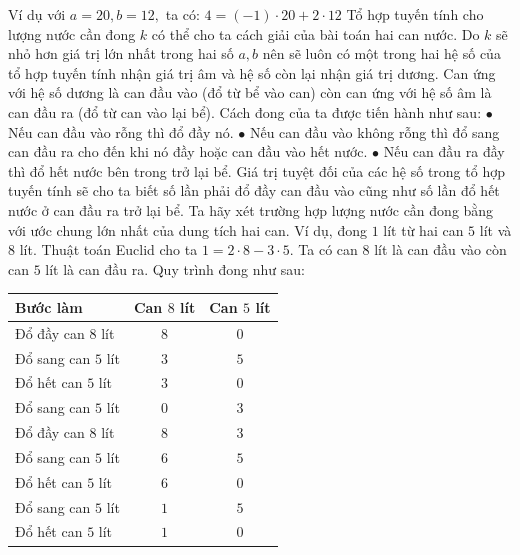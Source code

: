 \begin{multicols}{2}
	Ví dụ với $a=20,b=12,$ ta có: $4=(-1)\cdot 20+2\cdot 12$
	\vskip 0.1cm
	Tổ hợp tuyến tính cho lượng nước cần đong $k$ có thể cho ta cách giải của bài toán hai can nước. Do $k$ sẽ nhỏ hơn giá trị lớn nhất trong hai số $a,b$ nên sẽ luôn có một trong hai hệ số của tổ hợp tuyến tính nhận giá trị âm và hệ số còn lại nhận giá trị dương. Can ứng với hệ số dương là can đầu vào (đổ từ bể vào can) còn can ứng với hệ số âm là can đầu ra (đổ từ can vào lại bể).
	\vskip 0.1cm
	Cách đong của ta được tiến hành như sau:
	\vskip 0.05cm
	$\bullet$ Nếu can đầu vào rỗng thì đổ đầy nó.
	\vskip 0.05cm
	$\bullet$ Nếu can đầu vào không rỗng thì đổ sang can đầu ra cho đến khi nó đầy hoặc can đầu vào hết nước.
	\vskip 0.05cm
	$\bullet$ Nếu can đầu ra đầy thì đổ hết nước bên trong trở lại bể.
	\vskip 0.05cm
	Giá trị tuyệt đối của các hệ số trong tổ hợp tuyến tính sẽ cho ta biết số lần phải đổ đầy can đầu vào cũng như số lần đổ hết nước ở can đầu ra trở lại bể.
	\vskip 0.05cm
	Ta hãy xét trường hợp lượng nước cần đong bằng với ước chung lớn nhất của dung tích hai can. Ví dụ, đong $1$ lít từ hai can $5$ lít và $8$ lít. Thuật toán Euclid cho ta $1=2\cdot 8-3\cdot 5$. Ta có can $8$ lít là can đầu vào còn can $5$ lít là can đầu ra.
	\vskip 0.05cm
	Quy trình đong như sau:
	\begin{table}[H]
		\vspace*{-5pt}
		\centering
		\captionsetup{labelformat= empty, justification=centering}
		\setlength{\tabcolsep}{7pt}
		\renewcommand{\arraystretch}{1.1}
		\begin{tabular}{|l|c|c|}
			\hline
			Bước làm&	Can $8$ lít&	Can $5$ lít\\
			\hline
			Đổ đầy can $8$ lít&	$8$&	$0$\\
			\hline
			Đổ sang can $5$ lít&	$3$&	$5$\\
			\hline
			Đổ hết can $5$ lít&	$3$&	$0$\\
			\hline
			Đổ sang can $5$ lít&	$0$&	$3$\\
			\hline
			Đổ đầy can $8$ lít&	$8$&	$3$\\
			\hline
			Đổ sang can $5$ lít&	$6$&	$5$\\
			\hline
			Đổ hết can $5$ lít&	$6$&	$0$\\
			\hline
			Đổ sang can $5$ lít&	$1$&	$5$\\
			\hline
			Đổ hết can $5$ lít&	$1$	&$0$\\
			\hline
		\end{tabular}
		\vspace*{-10pt}
	\end{table}

\end{multicols}
